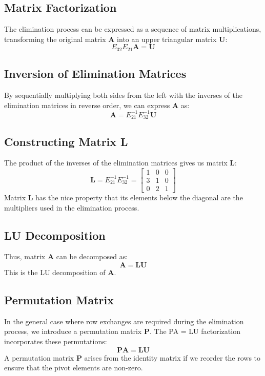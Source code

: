 \subsection*{Matrix Factorization}

The elimination process can be expressed as a sequence of matrix multiplications, transforming the original matrix \( \mathbf{A} \) into an upper triangular matrix \( \mathbf{U} \):
\[
E_{32}E_{21}\mathbf{A} = \mathbf{U}
\]

\subsection*{Inversion of Elimination Matrices}

By sequentially multiplying both sides from the left with the inverses of the elimination matrices in reverse order, we can express \( \mathbf{A} \) as:
\[
\mathbf{A} = E_{21}^{-1}E_{32}^{-1}\mathbf{U}
\]

\subsection*{Constructing Matrix L}

The product of the inverses of the elimination matrices gives us matrix \( \mathbf{L} \):
\[
\mathbf{L} = E_{21}^{-1}E_{32}^{-1} = \begin{bmatrix}
    1&0&0\\3&1&0\\0&2&1
\end{bmatrix}
\]
Matrix \( \mathbf{L} \) has the nice property that its elements below the diagonal are the multipliers used in the elimination process.

\subsection*{LU Decomposition}

Thus, matrix \( \mathbf{A} \) can be decomposed as:
\[
\mathbf{A} = \mathbf{L}\mathbf{U}
\]
This is the LU decomposition of \( \mathbf{A} \).

\subsection*{Permutation Matrix}

In the general case where row exchanges are required during the elimination process, we introduce a permutation matrix \( \mathbf{P} \). The PA = LU factorization incorporates these permutations:
\[
\mathbf{P}\mathbf{A} = \mathbf{L}\mathbf{U}
\]
A permutation matrix \( \mathbf{P} \) arises from the identity matrix if we reorder the rows to ensure that the pivot elements are non-zero.

